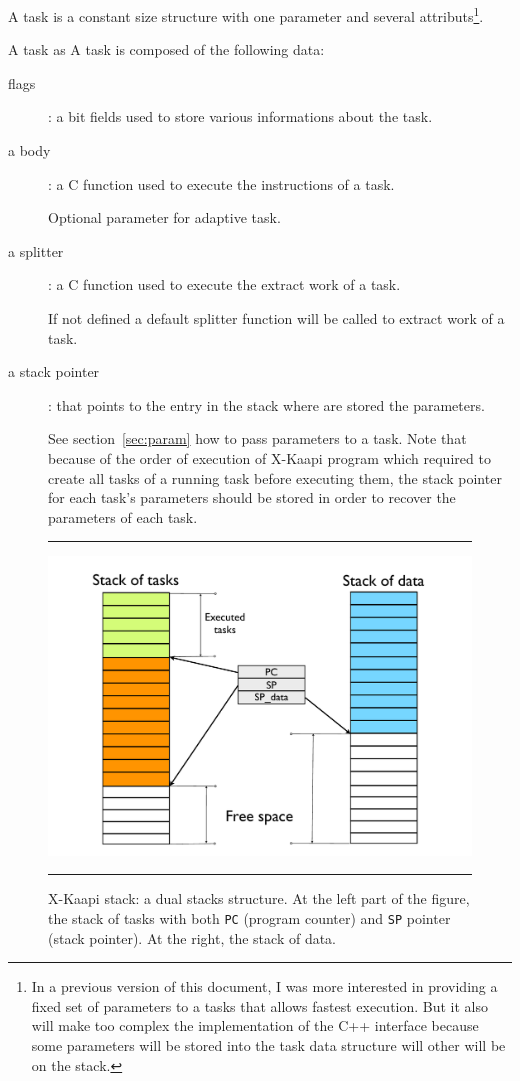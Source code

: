 \documentclass[12pt]{report}
\newcommand{\kaapi}{\textsc{X}-Kaapi\xspace}
\begin{document}
A task is a constant size structure with one parameter and several attributs\footnote{
In a previous version of this document, I was more interested in providing a fixed set of parameters to a tasks that allows fastest execution. But it also will make too complex the implementation of the C++ interface because some parameters will be stored into the task data structure will other will be on the stack.}.

A task as 
A task is composed of the following data:
\begin{description}
\item [flags]: a bit fields used to store various informations about the task.

\item [a body]: a C function used to execute the instructions of a task. 

Optional parameter for adaptive task.

\item [a splitter]: a C function used to execute the extract work of a task. 

If not defined a default splitter function will be called to extract work of a task.

\item [a stack pointer]: that points to the entry in the stack where are stored the parameters. 

See section~\ref{sec:param} how to pass parameters to a task.
Note that because of the order of execution of \kaapi program which required to create all tasks of a running task before executing them, the stack pointer for each task's parameters should be stored in order to recover the parameters of each task.
\end{description}

\begin{figure}[h!]
\hrule
\begin{center}
\includegraphics[width=0.5\linewidth]{stack}
\end{center}
\vspace*{-2ex}
\caption{\small \kaapi stack: a dual stacks structure. At the left part of the figure, the stack of tasks with both \texttt{PC} (program counter) and \texttt{SP} pointer (stack pointer). At the right, the stack of data.}
\label{fig:stack}
\vspace*{1ex}
\hrule
\end{figure}
\end{document}
